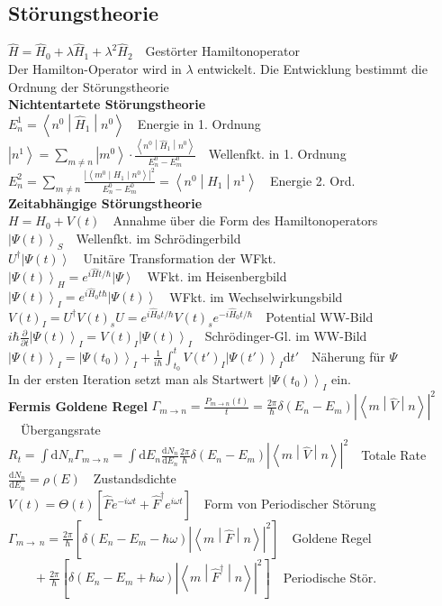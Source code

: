 \documentclass[8pt,a4paper]{extarticle}
\newcommand{\frml}[2]{$#1$~\hfill~#2\\}
\newcommand{\pder}[2]{\frac{\partial#1}{\partial#2}}
\newcommand{\tder}[2]{\frac{\mathrm d #1}{\mathrm d #2}}
\newcommand{\ket}[1]{\left|#1\right\rangle}
\newcommand{\oper}[1]{\hat#1}
\newcommand{\bratenket}[3]                            %
{\left\langle#1 \middle| #2 \middle|  %
#3\right\rangle}
\begin{document}
\begin{multicols}{3}
\subsection{St\"orungstheorie}
\frml{\oper{H} = \oper{H}_0 + \lambda\oper{H}_1 + \lambda^2\oper{H}_2}{Gest\"orter Hamiltonoperator}
Der Hamilton-Operator wird in $\lambda$ entwickelt. Die Entwicklung bestimmt die Ordnung der St\"orungstheorie\\
\textbf{Nichtentartete St\"orungstheorie}\\
\frml{E_n^1 = \bratenket{n^0}{\oper{H}_1}{n^0}}{Energie in 1. Ordnung}
\frml{\ket{n^1} = \sum_{m\neq n} \ket{m^0}\cdot\frac{\bratenket{n^0}{\oper{H}_1}{n^0}}{E_n^0-E_m^0}}{Wellenfkt. in 1. Ordnung}
\frml{E_n^2 = \sum_{m \neq n} \frac{\left|\bratenket{m^0}{H_1}{n^0}\right|^2}{E_n^0 - E_m^0} = \bratenket{n^0}{H_1}{n^1}}{Energie 2. Ord.}
\textbf{Zeitabh\"angige St\"orungstheorie}\\
\frml{H =H_0 + V(t)}{Annahme \"uber die Form des Hamiltonoperators}
\frml{\ket{\Psi(t)}_S}{Wellenfkt. im Schr\"odingerbild}
\frml{U^\dagger\ket{\Psi(t)}}{Unit\"are Transformation der WFkt.}
\frml{\ket{\Psi(t)}_H = e^{i\oper{H}t/\hbar}\ket{\Psi}}{WFkt. im Heisenbergbild}
\frml{\ket{\Psi(t)}_I = e^{i\oper{H}_0t\hbar}\ket{\Psi(t)}}{WFkt. im Wechselwirkungsbild}
\frml{V(t)_I = U^\dagger V(t)_s U = e^{i\oper{H}_0t/\hbar}V(t)_se^{-i\oper{H}_0t/\hbar}}{Potential WW-Bild}
\frml{i\hbar\pder{}{t}\ket{\Psi(t)}_I = V(t)_I\ket{\Psi(t)}_I}{Schr\"odinger-Gl. im WW-Bild}
\frml{\ket{\Psi(t)}_I = \ket{\Psi(t_0)}_I + \frac{1}{i\hbar}\int_{t_0}^tV(t')_I\ket{\Psi(t')}_I\mathrm{d}t'}{N\"aherung f\"ur $\Psi$}
In der ersten Iteration setzt man als Startwert $\ket{\Psi(t_0)}_I$ ein.\\
\textbf{Fermis Goldene Regel}
\frml{\Gamma_{m\to n} = \frac{P_{m\to n}(t)}{t} = \frac{2\pi}{\hbar}\delta(E_n-E_m)\left|\bratenket{m}{\oper{V}}{n}\right|^2}{\"Ubergangsrate}
\frml{R_t = \int \mathrm{d}N_n \Gamma_{m\to n} = \int \mathrm{d}E_n \tder{N_n}{E_n}\frac{2\pi}{\hbar}\delta(E_n-E_m)\left|\bratenket{m}{\oper{V}}{n}\right|^2}{Totale Rate}
\frml{\tder{N_n}{E_n} = \rho(E)}{Zustandsdichte}
\frml{V(t) = \Theta(t)\left[\oper{F}e^{-i\omega t}+\oper{F}^\dagger e^{i\omega t}\right]}{Form von Periodischer St\"orung}
\frml{\Gamma_{m\to\ n} = \frac{2\pi}{\hbar}\left[\delta(E_n-E_m-\hbar\omega)\left|\bratenket{m}{\oper{F}}{n}\right|^2\right]}{Goldene Regel}
\frml{\qquad + \frac{2\pi}{\hbar}\left[\delta(E_n-E_m+\hbar\omega)\left|\bratenket{m}{\oper{F}^\dagger}{n}\right|^2\right]}{Periodische St\"or.}

\end{multicols}
\end{document}
